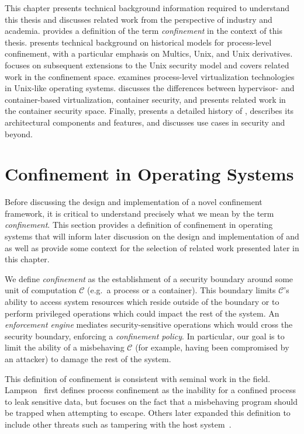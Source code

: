 This chapter presents technical background information required to understand this thesis
and discusses related work from the perspective of industry and academia.
 provides a definition of the term
\textit{confinement} in the context of this thesis. 
presents technical background on historical models for process-level confinement, with
a particular emphasis on Multics, Unix, and Unix derivatives.
 focuses on subsequent extensions to the Unix security model
and covers related work in the confinement space.  examines
process-level virtualization technologies in Unix-like operating systems.
 discusses the differences between hypervisor- and container-based
virtualization, container security, and presents related work in the container security
space. Finally,  presents a detailed history of ,
describes its architectural components and features, and discusses use cases in security
and beyond.

\section{Confinement in Operating Systems}%
\label{s:confinement-definition}

Before discussing the design and implementation of a novel confinement framework, it is
critical to understand precisely what we mean by the term \textit{confinement}. This
section provides a definition of confinement in operating systems that will inform later
discussion on the design and implementation of \bpfbox{} and \bpfcontain{} as well as
provide some context for the selection of related work presented later in this chapter.

We define \textit{confinement} as the establishment of a security boundary around some
unit of computation $\mathcal{C}$ (e.g.\ a process or a container). This boundary limits
$\mathcal{C}$'s ability to access system resources which reside outside of the boundary or
to perform privileged operations which could impact the rest of the system. An
\textit{enforcement engine} mediates security-sensitive operations which would cross the
security boundary, enforcing a \textit{confinement policy}. In particular, our goal is to
limit the ability of a misbehaving $\mathcal{C}$ (for example, having been compromised by
an attacker) to damage the rest of the system.

This definition of confinement is consistent with seminal work in the field.
Lampson~\cite{lampson1973_confinement} first defines process confinement as the inability
for a confined process to leak sensitive data, but focuses on the fact that a misbehaving
program should be trapped when attempting to escape. Others later expanded this definition
to include other threats such as tampering with the host system~\cite{kim2013_mbox,
goldberg96_janus, wagner1999_janus, jain2000_filtering, provos2003_systrace,
watson2010_capsicum}.

